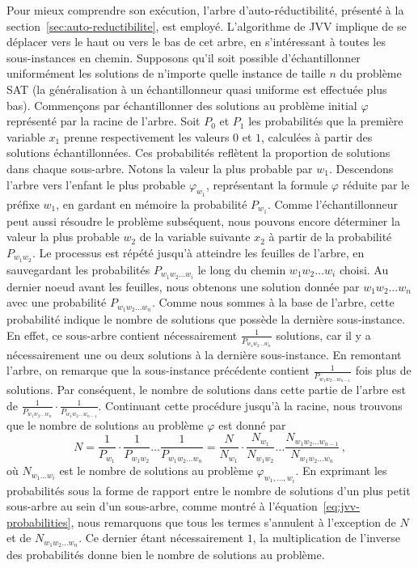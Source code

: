 Pour mieux comprendre son exécution, l'arbre d'auto-réductibilité, présenté à la section~\ref{sec:auto-reductibilite}, est employé. L'algorithme de JVV implique de se déplacer vers le haut ou vers le bas de cet arbre, en s'intéressant à toutes les sous-instances en chemin. Supposons qu'il soit possible d'échantillonner uniformément les solutions de n'importe quelle instance de taille $n$ du problème SAT (la généralisation à un échantillonneur quasi uniforme est effectuée plus bas). Commençons par échantillonner des solutions au problème initial $\varphi$ représenté par la racine de l'arbre. Soit $P_{0}$ et $P_{1}$ les probabilités que la première variable $x_{1}$ prenne respectivement les valeurs $0$ et $1$, calculées à partir des solutions échantillonnées. Ces probabilités reflètent la proportion de solutions dans chaque sous-arbre. Notons la valeur la plus probable par $w_{1}$. Descendons l'arbre vers l'enfant le plus probable $\varphi_{w_{1}}$, représentant la formule $\varphi$ réduite par le préfixe $w_{1}$, en gardant en mémoire la probabilité $P_{w_{1}}$. Comme l'échantillonneur peut aussi résoudre le problème subséquent, nous pouvons encore déterminer la valeur la plus probable $w_{2}$ de la variable suivante $x_{2}$ à partir de la probabilité $P_{w_{1}w_{2}}$. Le processus est répété jusqu'à atteindre les feuilles de l'arbre, en sauvegardant les probabilités $P_{w_{1} w_{2} \dots w_{i}}$ le long du chemin $w_{1} w_{2} \dots w_{i}$ choisi. Au dernier noeud avant les feuilles, nous obtenons une solution donnée par $w_{1} w_{2} \dots w_{n}$ avec une probabilité $P_{w_{1} w_{2} \dots w_{n}}$. Comme nous sommes à la base de l'arbre, cette probabilité indique le nombre de solutions que possède la dernière sous-instance. En effet, ce sous-arbre contient nécessairement $\frac{1}{P_{w_{1} w_{2} \dots w_{n}}}$ solutions, car il y a nécessairement une ou deux solutions à la dernière sous-instance. En remontant l'arbre, on remarque que la sous-instance précédente contient $\frac{1}{P_{w_{1} w_{2} \dots w_{n-1}}}$ fois plus de solutions. Par conséquent, le nombre de solutions dans cette partie de l'arbre est de $\frac{1}{P_{w_{1} w_{2} \dots w_{n}}} \cdot \frac{1}{P_{w_{1} w_{2} \dots w_{n-1}}}$. Continuant cette procédure jusqu'à la racine, nous trouvons que le nombre de solutions au problème $\varphi$ est donné par 
\begin{equation}
    \label{eq:jvv-probabilities}
    N = \frac{1}{P_{w_{1}}} \cdot \frac{1}{P_{w_{1} w_{2}}} \dots \frac{1}{P_{w_{1} w_{2} \dots w_{n}}} = \frac{N}{N_{w_{1}}} \cdot \frac{N_{w_{1}}}{N_{w_{1} w_{2}}} \dots \frac{N_{w_{1} w_{2} \dots w_{n-1}}}{N_{w_{1} w_{2} \dots w_{n}}} \,,
\end{equation}
où $N_{w_{1} \dots w_{i}}$ est le nombre de solutions au problème $\varphi_{w_{1}, \dots, w_{i}}$. En exprimant les probabilités sous la forme de rapport entre le nombre de solutions d'un plus petit sous-arbre au sein d'un sous-arbre, comme montré à l'équation~\ref{eq:jvv-probabilities}, nous remarquons que tous les termes s'annulent à l'exception de $N$ et de $N_{w_{1}w_{2}\dots w_{n}}$. Ce dernier étant nécessairement $1$, la multiplication de l'inverse des probabilités donne bien le nombre de solutions au problème.

